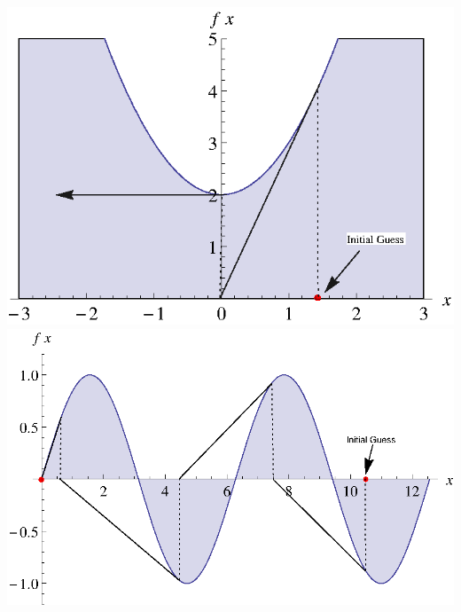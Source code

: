 \documentclass{report}
\begin{document}
\begin{enumerate}
\\\includegraphics[scale=.65]{divergence.eps} \includegraphics[scale=.65]{rootskipping.eps}
\\
\\
\\
\\
\end{enumerate}
\end{document}
